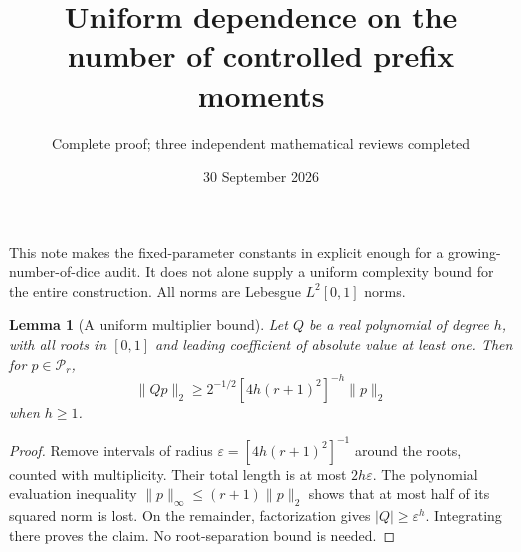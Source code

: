 \documentclass[11pt]{article}
\title{Uniform dependence on the number of controlled prefix moments}
\author{Complete proof; three independent mathematical reviews completed}
\date{30 September 2026}
\newtheorem{lemma}{Lemma}\newtheorem{theorem}{Theorem}
\newcommand{\PP}{\mathcal P}
\begin{document}
\maketitle
This note makes the fixed-parameter constants in
explicit enough for a growing-number-of-dice audit. It does not alone
supply a uniform complexity bound for the entire construction.
All norms are Lebesgue $L^2[0,1]$ norms.

\begin{lemma}[A uniform multiplier bound]\label{multiplier}
Let $Q$ be a real polynomial of degree $h$, with all roots in $[0,1]$
and leading coefficient of absolute value at least one. Then for
$p\in\PP_r$,
\[
 \|Qp\|_2\ge 2^{-1/2}[4h(r+1)^2]^{-h}\|p\|_2
\]
when $h\ge1$.
\end{lemma}
\begin{proof}
Remove intervals of radius $\varepsilon=[4h(r+1)^2]^{-1}$ around
the roots, counted with multiplicity. Their total length is at most
$2h\varepsilon$. The polynomial evaluation inequality
$\|p\|_\infty\le(r+1)\|p\|_2$ shows that at most half of its squared
norm is lost. On the remainder, factorization gives
$|Q|\ge\varepsilon^h$. Integrating there proves the claim.
No root-separation bound is needed.
\end{proof}
\end{document}
